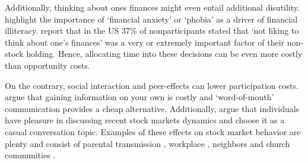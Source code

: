 \documentclass[ProjectABM]{subfiles}
\begin{document}
Additionally, thinking about ones finances might even entail additional disutility. \cite{shapiro_burchell_2012} highlight the importance of `financial anxiety' or `phobia' as a driver of financial illiteracy. \cite{choi_2020} report that in the US 37\% of nonparticipants stated that `not liking to think about one's finances' was a very or extremely important factor of their non-stock holding. Hence, allocating time into these decisions can be even more costly than opportunity costs.



On the contrary, social interaction and peer-effects can lower participation costs. %
\cite{brown_2008} argue that gaining information on your own is costly and `word-of-mouth' communication provides a cheap alternative. Additionally, \cite{hong_et_al_2004social} argue that individuals have pleasure in discussing recent stock markets dynamics and choose it as a casual conversation topic. Examples of these effects on stock market behavior are plenty and consist of parental transmission \citep{CS2000_parental}, workplace \citep{duflo_saez2002_workplace}, neighbors and church communities \citep{hong_et_al_2004social}.




\end{document}

